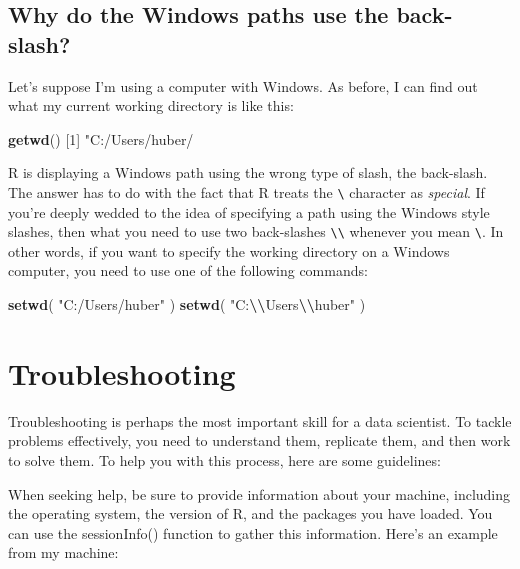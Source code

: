 \documentclass[
  12pt,
  oneside]{book}
\newenvironment{Shaded}{\begin{snugshade}}{\end{snugshade}}
\newcommand{\DecValTok}[1]{\textcolor[rgb]{0.00,0.00,0.81}{#1}}
\newcommand{\FunctionTok}[1]{\textcolor[rgb]{0.13,0.29,0.53}{\textbf{#1}}}
\newcommand{\NormalTok}[1]{#1}
\newcommand{\SpecialCharTok}[1]{\textcolor[rgb]{0.81,0.36,0.00}{\textbf{#1}}}
\newcommand{\StringTok}[1]{\textcolor[rgb]{0.31,0.60,0.02}{#1}}
\theoremstyle{definition}
\theoremstyle{definition}
\theoremstyle{definition}
\theoremstyle{definition}
\theoremstyle{remark}
\begin{document}
\hypertarget{sec:winbackslash}{%
\subsection{Why do the Windows paths use the back-slash?}\label{sec:winbackslash}}

Let's suppose I'm using a computer with Windows. As before, I can find out what my current working directory is like this:

\begin{Shaded}
\begin{Highlighting}[]
\FunctionTok{getwd}\NormalTok{()}
\NormalTok{[}\DecValTok{1}\NormalTok{] }\StringTok{"C:/Users/huber/}
\end{Highlighting}
\end{Shaded}

R is displaying a Windows path using the wrong type of slash, the back-slash. The answer has to do with the fact that R treats the \texttt{\textbackslash{}} character as \emph{special}. If you're deeply wedded to the idea of specifying a path using the Windows style slashes, then what you need to use two back-slashes \texttt{\textbackslash{}\textbackslash{}} whenever you mean \texttt{\textbackslash{}}. In other words, if you want to specify the working directory on a Windows computer, you need to use one of the following commands:

\begin{Shaded}
\begin{Highlighting}[]
\FunctionTok{setwd}\NormalTok{( }\StringTok{"C:/Users/huber"}\NormalTok{ )}
\FunctionTok{setwd}\NormalTok{( }\StringTok{"C:}\SpecialCharTok{\textbackslash{}\textbackslash{}}\StringTok{Users}\SpecialCharTok{\textbackslash{}\textbackslash{}}\StringTok{huber"}\NormalTok{ )}
\end{Highlighting}
\end{Shaded}

\hypertarget{troubleshooting}{%
\section{Troubleshooting}\label{troubleshooting}}

Troubleshooting is perhaps the most important skill for a data scientist. To tackle problems effectively, you need to understand them, replicate them, and then work to solve them. To help you with this process, here are some guidelines:

When seeking help, be sure to provide information about your machine, including the operating system, the version of R, and the packages you have loaded. You can use the sessionInfo() function to gather this information. Here's an example from my machine:
\end{document}
